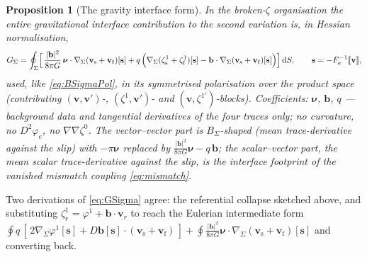 \documentclass[11pt]{article}
\newtheorem{proposition}{Proposition}
\newcommand{\bnu}{\bm{\nu}}
\newcommand{\bs}{\mathbf{s}}
\newcommand{\bv}{\mathbf{v}}
\newcommand{\jump}[1]{[\![#1]\!]}
\newcommand{\dS}{\,\mathrm{d}S}
\begin{document}
\begin{proposition}[The gravity interface form]\label{prop:GSigma}
In the broken-$\zeta$ organisation the entire gravitational interface
contribution to the second variation is, in Hessian normalisation,
\begin{equation}
  G_\Sigma
  = \oint_\Sigma \Bigl[\,
      \frac{|\mathbf{b}|^2}{8\pi G}\,
        \bnu\cdot\nabla_\Sigma(\bv_{\mathrm{s}} + \bv_{\mathrm{f}})[\bs]
      + q\,\Bigl( \nabla_\Sigma(\zeta_{\mathrm{s}}^1
                          + \zeta_{\mathrm{f}}^1)[\bs]
      - \mathbf{b}\cdot\nabla_\Sigma(\bv_{\mathrm{s}}
                          + \bv_{\mathrm{f}})[\bs] \Bigr)
    \Bigr] \dS,
  \qquad \bs = -F_e^{-1}\jump{\bv},
  \label{eq:GSigma}
\end{equation}
used, like \eqref{eq:BSigmaPol}, in its symmetrised polarisation over
the product space (contributing $(\bv,\bv')$-, $(\zeta^1,\bv')$- and
$(\bv,\zeta^{1\prime})$-blocks). Coefficients: $\bnu$, $\mathbf{b}$,
$q$ --- background data and \emph{tangential} derivatives of the four
traces only; no curvature, no $D^2\varphi_e$, no $\nabla\nabla\zeta^0$.
The vector--vector part is $B_\Sigma$-shaped (mean trace-derivative
against the slip) with $-\pi\bnu$ replaced by
$\tfrac{|\mathbf{b}|^2}{8\pi G}\bnu - q\,\mathbf{b}$; the
scalar--vector part, the mean scalar trace-derivative against the
slip, is the interface footprint of the vanished mismatch coupling
\eqref{eq:mismatch}.
\end{proposition}

Two derivations of \eqref{eq:GSigma} agree: the referential collapse
sketched above, and substituting $\zeta_r^1 = \varphi^1 +
\mathbf{b}\cdot\bv_r$ to reach the Eulerian intermediate form
$\oint q\,[\,2\nabla_\Sigma\varphi^1[\bs] +
D\mathbf{b}[\bs]\cdot(\bv_{\mathrm{s}}+\bv_{\mathrm{f}})\,] +
\oint \tfrac{|\mathbf{b}|^2}{8\pi G}\bnu\cdot\nabla_\Sigma(\bv_{\mathrm{s}}
+ \bv_{\mathrm{f}})[\bs]$ and converting back.
\end{document}
